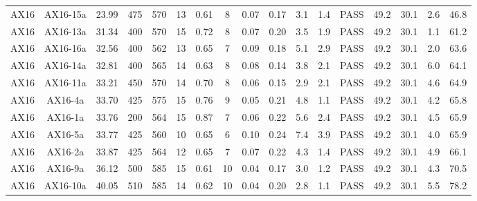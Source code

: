 \documentclass[9pt,twoside]{pnas-new}
\begin{document}
\begin{table}
\begin{tabular}{ccccccccccccccccc}
AX16 & AX16-15a & 23.99     & 475       & 570       & 13 & 0.61 & 8     & 0.07    & 0.17    & 3.1            & 1.4             & PASS & 49.2       & 30.1          & 2.6      & 46.8          \\
AX16 & AX16-13a & 31.34     & 400       & 570       & 15 & 0.72 & 8     & 0.07    & 0.20    & 3.5            & 1.9             & PASS & 49.2       & 30.1          & 1.1      & 61.2          \\
AX16 & AX16-16a & 32.56     & 400       & 562       & 13 & 0.65 & 7     & 0.09    & 0.18    & 5.1            & 2.9             & PASS & 49.2       & 30.1          & 2.0      & 63.6          \\
AX16 & AX16-14a & 32.81     & 400       & 565       & 14 & 0.63 & 8     & 0.08    & 0.14    & 3.8            & 2.1             & PASS & 49.2       & 30.1          & 6.0      & 64.1          \\
AX16 & AX16-11a & 33.21     & 450       & 570       & 14 & 0.70 & 8     & 0.06    & 0.15    & 2.9            & 2.1             & PASS & 49.2       & 30.1          & 4.6      & 64.9          \\
AX16 & AX16-4a  & 33.70     & 425       & 575       & 15 & 0.76 & 9     & 0.05    & 0.21    & 4.8            & 1.1             & PASS & 49.2       & 30.1          & 4.2      & 65.8          \\
AX16 & AX16-1a  & 33.76     & 200       & 564       & 15 & 0.87 & 7     & 0.06    & 0.22    & 5.6            & 2.4             & PASS & 49.2       & 30.1          & 4.5      & 65.9          \\
AX16 & AX16-5a  & 33.77     & 425       & 560       & 10 & 0.65 & 6     & 0.10    & 0.24    & 7.4            & 3.9             & PASS & 49.2       & 30.1          & 4.0      & 65.9          \\
AX16 & AX16-2a  & 33.87     & 425       & 564       & 12 & 0.65 & 7     & 0.07    & 0.22    & 4.3            & 1.4             & PASS & 49.2       & 30.1          & 4.9      & 66.1          \\
AX16 & AX16-9a  & 36.12     & 500       & 585       & 15 & 0.61 & 10    & 0.04    & 0.17    & 3.0            & 1.2             & PASS & 49.2       & 30.1          & 4.3      & 70.5          \\
AX16 & AX16-10a & 40.05     & 510       & 585       & 14 & 0.62 & 10    & 0.04    & 0.20    & 2.8            & 1.1             & PASS & 49.2       & 30.1          & 5.5      & 78.2         \\
\hline
\end{tabular}
\label{tab:PINT_result}
\end{table}
\end{document}
